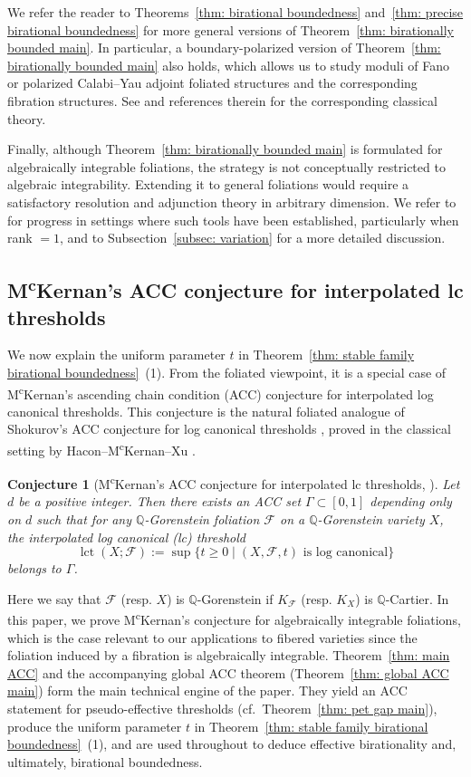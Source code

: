 \documentclass[11pt,reqno]{amsart}
\numberwithin{equation}{section}
\newcommand{\lct}{\operatorname{lct}}
\newcommand{\Ff}{\mathcal{F}}
\newcommand{\Ii}{\Gamma}
\newtheorem{alphconj}[alphthm]{Conjecture}
\theoremstyle{definition}
\begin{document}
We refer the reader to Theorems~\ref{thm: birational boundedness} and~\ref{thm: precise birational boundedness} for more general versions of Theorem~\ref{thm: birationally bounded main}. In particular, a boundary-polarized version of Theorem~\ref{thm: birationally bounded main} also holds, which allows us to study moduli of Fano or polarized Calabi--Yau adjoint foliated structures and the corresponding fibration structures. See \cite{KX20,Asc+23,BL24} and references therein for the corresponding classical theory. 

Finally, although Theorem~\ref{thm: birationally bounded main} is formulated for algebraically integrable foliations, the strategy is not conceptually restricted to algebraic integrability.
Extending it to general foliations would require a satisfactory resolution and adjunction theory in arbitrary dimension.
We refer to \cite{SS23,Pas24,SSV25} for progress in settings where such tools have been established, particularly when rank $=1$, and to Subsection~\ref{subsec: variation} for a more detailed discussion.


\subsection{M\textsuperscript{c}Kernan's ACC conjecture for interpolated lc thresholds}

We now explain the uniform parameter $t$ in Theorem~\ref{thm: stable family birational boundedness}~(1). From the foliated viewpoint, it is a special case of M\textsuperscript{c}Kernan's ascending chain condition (ACC) conjecture for interpolated log canonical thresholds. This conjecture is the natural foliated analogue of Shokurov's ACC conjecture for log canonical thresholds \cite{Sho92}, proved in the classical setting by Hacon--M\textsuperscript{c}Kernan--Xu \cite[Theorem~1.1]{HMX14}.

\begin{alphconj}[M\textsuperscript{c}Kernan's ACC conjecture for interpolated lc thresholds, {\cite[28:22]{McK22}}]\label{conj: acc interpolated}
Let $d$ be a positive integer. Then there exists an ACC set $\Ii\subset [0,1]$ depending only on $d$ such that for any $\mathbb Q$-Gorenstein foliation $\Ff$ on a $\mathbb Q$-Gorenstein variety $X$, the interpolated log canonical (lc) threshold
\[
\lct(X;\Ff):=\sup\{t\geq 0\mid (X,\Ff,t)\text{ is log canonical}\}
\]
belongs to $\Ii$.
\end{alphconj}
Here we say that $\Ff$ (resp. $X$) is $\mathbb Q$-Gorenstein if $K_{\Ff}$ (resp. $K_X$) is $\mathbb Q$-Cartier. In this paper, we prove M\textsuperscript{c}Kernan's conjecture for algebraically integrable foliations, which is the case relevant to our applications to fibered varieties since the foliation induced by a fibration is algebraically integrable. Theorem~\ref{thm: main ACC} and the accompanying global ACC theorem (Theorem~\ref{thm: global ACC main}) form the main technical engine of the paper. They yield an ACC statement for pseudo-effective thresholds (cf.~Theorem~\ref{thm: pet gap main}), produce the uniform parameter $t$ in Theorem~\ref{thm: stable family birational boundedness}~(1), and are used throughout to deduce effective birationality and, ultimately, birational boundedness.
\end{document}

